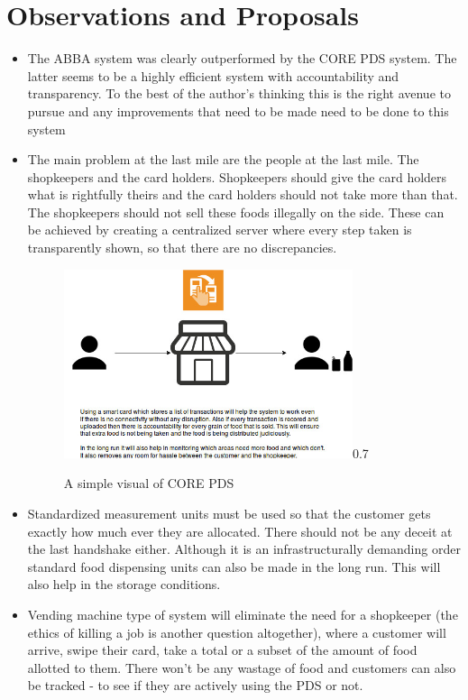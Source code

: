 \documentclass[a4paper,11pt]{article}
\begin{document}
\section{Observations and Proposals}
\begin{itemize}
    \item The ABBA system was clearly outperformed by the CORE PDS system. The latter seems to be a highly efficient system with accountability and transparency. To the best of the author's thinking this is the right avenue to pursue and any improvements that need to be made need to be done to this system
    
    \item The main problem at the last mile are the people at the last mile. The shopkeepers and the card holders. Shopkeepers should give the card holders what is rightfully theirs and the card holders should not take more than that. The shopkeepers should not sell these foods illegally on the side. These can be achieved by creating a centralized server where every step taken is transparently shown, so that there are no discrepancies. 
    
    \begin{figure}[h!]
        \centering
        \begin{annotate}{\includegraphics[width=0.8\textwidth]{pds.jpg}}{0.7}
        \end{annotate}
        \caption{A simple visual of CORE PDS\protect\footnotemark}\label{fig:Airbus}
    \end{figure}
    
    \item Standardized measurement units must be used so that the customer gets exactly how much ever they are allocated. There should not be any deceit at the last handshake either. Although it is an infrastructurally demanding order standard food dispensing units can also be made in the long run. This will also help in the storage conditions. 
    
    \item Vending machine type of system will eliminate the need for a shopkeeper (the ethics of killing a job is another question altogether), where a customer will arrive, swipe their card, take a total or a subset of the amount of food allotted to them. There won't be any wastage of food and customers can also be tracked - to see if they are actively using the PDS or not.  

\end{itemize}
\end{document}
